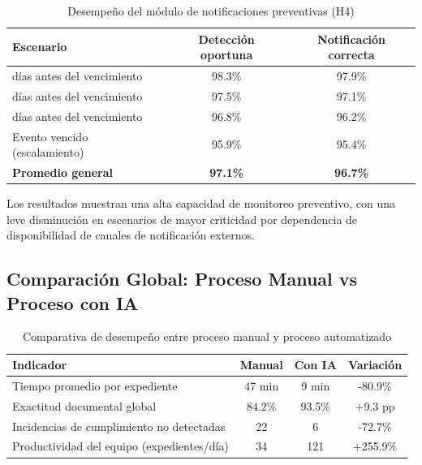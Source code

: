 \documentclass[12pt]{article}
\begin{document}
\begin{table}[htbp]
\centering
\caption{Desempeño del módulo de notificaciones preventivas (H4)}
\vspace{0.3cm}
\label{tab:resultados-h4-notificaciones}
\begin{tabularx}{\textwidth}{|>{\raggedright\arraybackslash}X|c|c|}
\hline
\textbf{Escenario} & \textbf{Detección oportuna} & \textbf{Notificación correcta} \\
\hline
90 días antes del vencimiento & 98.3\% & 97.9\% \\
\hline
60 días antes del vencimiento & 97.5\% & 97.1\% \\
\hline
30 días antes del vencimiento & 96.8\% & 96.2\% \\
\hline
Evento vencido (escalamiento) & 95.9\% & 95.4\% \\
\hline
\textbf{Promedio general} & \textbf{97.1\%} & \textbf{96.7\%} \\
\hline
\end{tabularx}
\end{table}

Los resultados muestran una alta capacidad de monitoreo preventivo, con una leve disminución en escenarios de mayor criticidad por dependencia de disponibilidad de canales de notificación externos.

\subsection{Comparación Global: Proceso Manual vs Proceso con IA}

\begin{table}[htbp]
\centering
\caption{Comparativa de desempeño entre proceso manual y proceso automatizado}
\vspace{0.3cm}
\label{tab:comparativa-manual-vs-ia}
\begin{tabularx}{\textwidth}{|>{\raggedright\arraybackslash}X|c|c|c|}
\hline
\textbf{Indicador} & \textbf{Manual} & \textbf{Con IA} & \textbf{Variación} \\
\hline
Tiempo promedio por expediente & 47 min & 9 min & -80.9\% \\
\hline
Exactitud documental global & 84.2\% & 93.5\% & +9.3 pp \\
\hline
Incidencias de cumplimiento no detectadas & 22 & 6 & -72.7\% \\
\hline
Productividad del equipo (expedientes/día) & 34 & 121 & +255.9\% \\
\hline
\end{tabularx}
\end{table}
\end{document}
